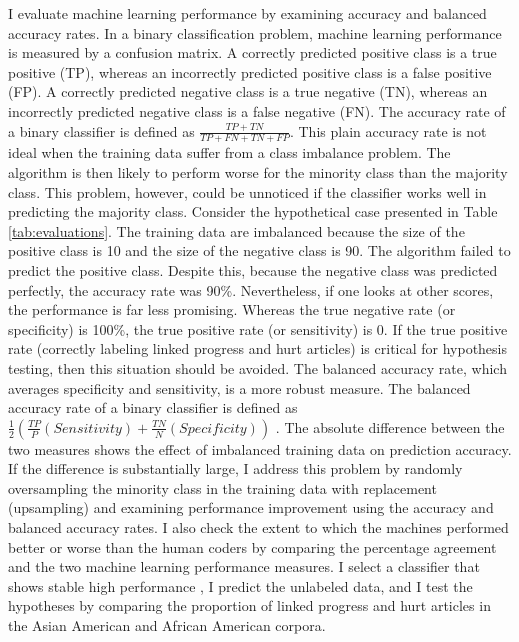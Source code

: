 \documentclass[12 pt]{article}
\begin{document}
I evaluate machine learning performance by examining accuracy and balanced accuracy rates. In a binary classification problem, machine learning performance is measured by a confusion matrix. A correctly predicted positive class is a true positive (TP), whereas an incorrectly predicted positive class is a false positive (FP). A correctly predicted negative class is a true negative (TN), whereas an incorrectly predicted negative class is a false negative (FN). The accuracy rate of a binary classifier is defined as $\frac{TP + TN}{TP + FN + TN + FP}$. This plain accuracy rate is not ideal when the training data suffer from a class imbalance problem. The algorithm is then likely to perform worse for the minority class than the majority class. This problem, however, could be unnoticed if the classifier works well in predicting the majority class. Consider the hypothetical case presented in Table \ref{tab:evaluations}. The training data are imbalanced because the size of the positive class is 10 and the size of the negative class is 90. The algorithm failed to predict the positive class. Despite this, because the negative class was predicted perfectly, the accuracy rate was 90\%. Nevertheless, if one looks at other scores, the performance is far less promising. Whereas the true negative rate (or specificity) is 100\%, the true positive rate (or sensitivity) is 0. If the true positive rate (correctly labeling linked progress and hurt articles) is critical for hypothesis testing, then this situation should be avoided. The balanced accuracy rate, which averages specificity and sensitivity, is a more robust measure. The balanced accuracy rate of a binary classifier is defined as $\frac{1}{2}(\frac{TP}{P} (Sensitivity) + \frac{TN}{N} (Specificity))$ \citep[3122-3123]{brodersen2010balanced}. The absolute difference between the two measures shows the effect of imbalanced training data on prediction accuracy. If the difference is substantially large, I address this problem by randomly oversampling the minority class in the training data with replacement (upsampling) and examining performance improvement using the accuracy and balanced accuracy rates. I also check the extent to which the machines performed better or worse than the human coders by comparing the percentage agreement and the two machine learning performance measures. I select a classifier that shows stable high performance \citep{yu2013stability}, I predict the unlabeled data, and I test the hypotheses by comparing the proportion of linked progress and hurt articles in the Asian American and African American corpora.
\end{document}
